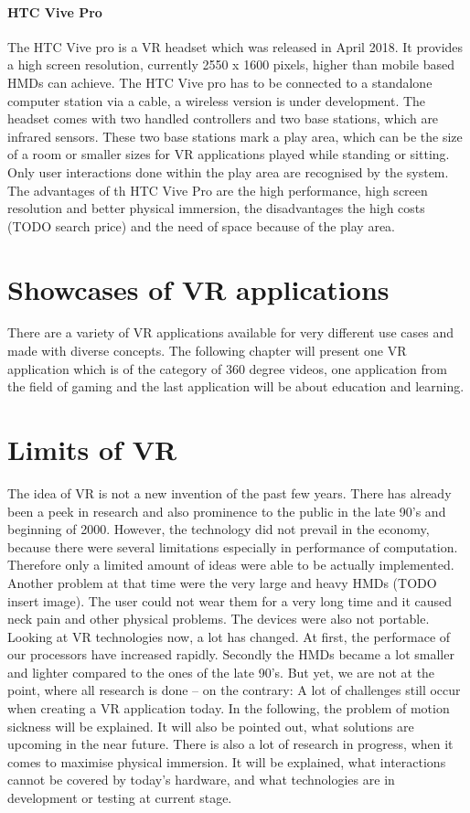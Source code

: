 \paragraph{HTC Vive Pro}
The HTC Vive pro is a VR headset which was released in April 2018. It provides a high screen resolution, currently 2550 x 1600 pixels, higher than mobile based HMDs can achieve. The HTC Vive pro has to be connected to a standalone computer station via a cable, a wireless version is under development. The headset comes with two handled controllers and two base stations, which are infrared sensors. 
These two base stations mark a play area, which can be the size of a room or smaller sizes for VR applications played while standing or sitting. Only user interactions done within the play area are recognised by the system. \cite{Ogdon.2019}
The advantages of th HTC Vive Pro are the high performance, high screen resolution and better physical immersion, the disadvantages the high costs (TODO search price) and the need of space because of the play area.

\section{Showcases of VR applications}
There are a variety of VR applications available for very different use cases and made with diverse concepts. The following chapter will present one VR application which is of the category of 360 degree videos, one application from the field of gaming and the last application will be about education and learning.
\section{Limits of VR} \label{limits}
The idea of VR is not a new invention of the past few years. There has already been a peek in research and also prominence to the public in the late 90's and beginning of 2000. However, the technology did not prevail in the economy, because there were several limitations especially in performance of computation. Therefore only a limited amount of ideas were able to be actually implemented. Another problem at that time were the very large and heavy HMDs (TODO insert image). The user could not wear them for a very long time and it caused neck pain and other physical problems. The devices were also not portable. \cite{Jerald.2016}\\
Looking at VR technologies now, a lot has changed. At first, the performace of our processors have increased rapidly. Secondly the HMDs became a lot smaller and lighter compared to the ones of the late 90's. But yet, we are not at the point, where all research is done -- on the contrary: A lot of challenges still occur when creating a VR application today. In the following, the problem of motion sickness will be explained. It will also be pointed out, what solutions are upcoming in the near future. There is also a lot of research in progress, when it comes to maximise physical immersion. It will be explained, what interactions cannot be covered by today's hardware, and what technologies are in development or testing at current stage.
